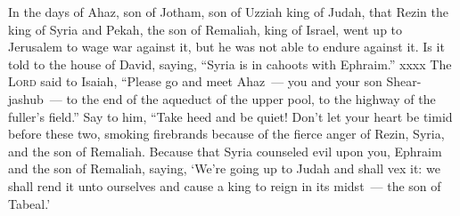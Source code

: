 
\begin{inparaenum}
   In the days of Ahaz, son of Jotham, son of Uzziah king of Judah, that Rezin the king of Syria and Pekah, the son of Remaliah, king of Israel, went up to Jerusalem to wage war against it, but he was not able to endure against it.%
   Is it told to the house of David, saying, ``Syria is in cahoots with Ephraim.'' xxxx%
   The \textsc{Lord} said to Isaiah, ``Please go and meet Ahaz~--- you and your son Shear-jashub~--- to the end of the aqueduct of the upper pool, to the highway of the fuller's field.''%
   Say to him, ``Take heed and be quiet! Don't let your heart be timid before these two, smoking firebrands because of the fierce anger of Rezin, Syria, and the son of Remaliah.%
   Because that Syria counseled evil upon you, Ephraim and the son of Remaliah, saying,%
   `We're going up to Judah and shall vex it: we shall rend it unto ourselves and cause a king to reign in its midst~--- the son of Tabeal.'\smallskip%
  
  
  
  
  
  

\end{inparaenum}

